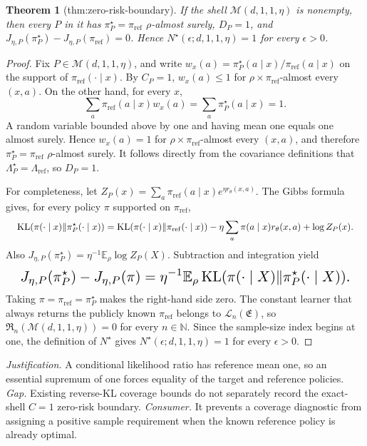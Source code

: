 \documentclass{article}
\newtheorem{theorem}{Theorem}
\begin{document}
\begin{theorem}[thm:zero-risk-boundary]\label{thm:zero-risk-boundary}
If the shell \(\mathcal M(d,1,1,\eta)\) is nonempty, then every \(P\) in it has \(\pi_P^\star=\pi_{\mathrm{ref}}\) \(\rho\)-almost surely, \(D_P=1\), and \(J_{\eta,P}(\pi_P^\star)-J_{\eta,P}(\pi_{\mathrm{ref}})=0\). Hence \(N^\star(\epsilon;d,1,1,\eta)=1\) for every \(\epsilon>0\).
\end{theorem}
\begin{proof}
Fix \(P\in\mathcal M(d,1,1,\eta)\), and write \(w_x(a)=\pi_P^\star(a\mid x)/\pi_{\mathrm{ref}}(a\mid x)\) on the support of \(\pi_{\mathrm{ref}}(\cdot\mid x)\). By \(C_P=1\), \(w_x(a)\le 1\) for \(\rho\times\pi_{\mathrm{ref}}\)-almost every \((x,a)\). On the other hand, for every \(x\),
\[
\sum_a\pi_{\mathrm{ref}}(a\mid x)w_x(a)=\sum_a\pi_P^\star(a\mid x)=1.
\]
A random variable bounded above by one and having mean one equals one almost surely. Hence \(w_x(a)=1\) for \(\rho\times\pi_{\mathrm{ref}}\)-almost every \((x,a)\), and therefore \(\pi_P^\star=\pi_{\mathrm{ref}}\) \(\rho\)-almost surely. It follows directly from the covariance definitions that \(\Lambda_P^\star=\Lambda_{\mathrm{ref}}\), so \(D_P=1\).

For completeness, let \(Z_P(x)=\sum_a\pi_{\mathrm{ref}}(a\mid x)e^{\eta r_\theta(x,a)}\). The Gibbs formula gives, for every policy \(\pi\) supported on \(\pi_{\mathrm{ref}}\),
\[
\makebox[\linewidth][c]{\resizebox{0.98\linewidth}{!}{\(\displaystyle \operatorname{KL}(\pi(\cdot\mid x)\Vert\pi_P^\star(\cdot\mid x))
=\operatorname{KL}(\pi(\cdot\mid x)\Vert\pi_{\mathrm{ref}}(\cdot\mid x))-\eta\sum_a\pi(a\mid x)r_\theta(x,a)+\log Z_P(x).\)}}
\]
Also \(J_{\eta,P}(\pi_P^\star)=\eta^{-1}\mathbb E_\rho\log Z_P(X)\). Subtraction and integration yield
\[
\makebox[\linewidth][c]{\resizebox{0.98\linewidth}{!}{\par\noindent \makebox[\linewidth][c]{\resizebox{0.98\linewidth}{!}{\(\displaystyle \displaystyle J_{\eta,P}(\pi_P^\star)-J_{\eta,P}(\pi)=\eta^{-1}\mathbb E_\rho\operatorname{KL}(\pi(\cdot\mid X)\Vert\pi_P^\star(\cdot\mid X)).\)}}\par\noindent}}
\]
Taking \(\pi=\pi_{\mathrm{ref}}=\pi_P^\star\) makes the right-hand side zero. The constant learner that always returns the publicly known \(\pi_{\mathrm{ref}}\) belongs to \(\mathcal L_n(\mathfrak E)\), so \(\mathfrak R_n(\mathcal M(d,1,1,\eta))=0\) for every \(n\in\mathbb N\). Since the sample-size index begins at one, the definition of \(N^\star\) gives \(N^\star(\epsilon;d,1,1,\eta)=1\) for every \(\epsilon>0\).
\end{proof}
\par\smallskip\noindent \textit{Justification.} A conditional likelihood ratio has reference mean one, so an essential supremum of one forces equality of the target and reference policies. \textit{Gap.} Existing reverse-KL coverage bounds do not separately record the exact-shell \(C=1\) zero-risk boundary. \textit{Consumer.} It prevents a coverage diagnostic from assigning a positive sample requirement when the known reference policy is already optimal.
\end{document}
